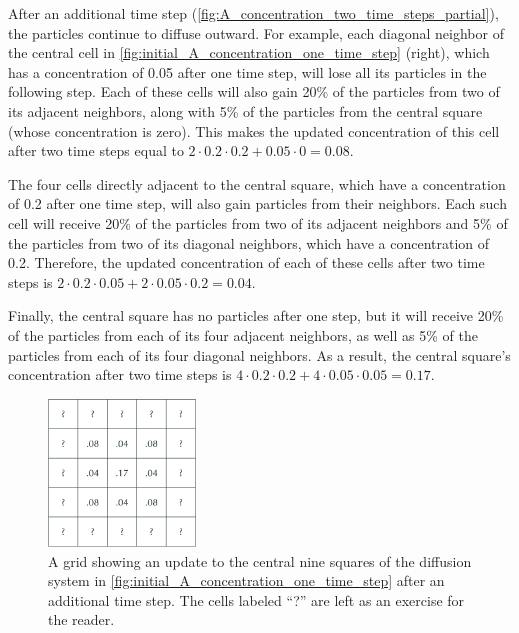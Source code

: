 After an additional time step (\autoref{fig:A_concentration_two_time_steps_partial}), the particles continue to diffuse outward. For example, each diagonal neighbor of the central cell in \autoref{fig:initial_A_concentration_one_time_step} (right), which has a concentration of 0.05 after one time step, will lose all its particles in the following step. Each of these cells will also gain 20\% of the particles from two of its adjacent neighbors, along with 5\% of the particles from the central square (whose concentration is zero). This makes the updated concentration of this cell after two time steps equal to $2 \cdot 0.2 \cdot 0.2 + 0.05 \cdot 0 = 0.08$.

The four cells directly adjacent to the central square, which have a concentration of 0.2 after one time step, will also gain particles from their neighbors. Each such cell will receive 20\% of the particles from two of its adjacent neighbors and 5\% of the particles from two of its diagonal neighbors, which have a concentration of 0.2. Therefore, the updated concentration of each of these cells after two time steps is $2 \cdot 0.2 \cdot 0.05 + 2 \cdot 0.05 \cdot 0.2 = 0.04$.

Finally, the central square has no particles after one step, but it will receive 20\% of the particles from each of its four adjacent neighbors, as well as 5\% of the particles from each of its four diagonal neighbors. As a result, the central square's concentration after two time steps is $4 \cdot 0.2 \cdot 0.2 + 4 \cdot 0.05 \cdot 0.05 = 0.17$.\\

\begin{figure}[h]
\centering
\mySfFamily
\includegraphics[width = 0.35\textwidth]{../images_CMYK/A_concentration_two_time_steps_partial}
\caption{A grid showing an update to the central nine squares of the diffusion system in \autoref{fig:initial_A_concentration_one_time_step} after an additional time step. The cells labeled ``?'' are left as an exercise for the reader.}
\label{fig:A_concentration_two_time_steps_partial}
\end{figure}


